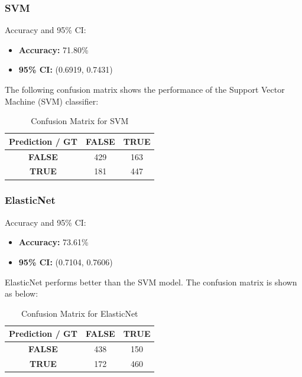 \subsubsection{SVM}

Accuracy and 95\% CI:

\begin{itemize}
    \item \textbf{Accuracy:} 71.80\%
    \item \textbf{95\% CI:} (0.6919, 0.7431)
\end{itemize}

The following confusion matrix shows the performance of the Support Vector Machine (SVM) classifier:

\begin{table}[ht]
    \centering
    \begin{tabular}{|c|c|c|}
    \hline
    \textbf{Prediction / GT} & \textbf{FALSE} & \textbf{TRUE} \\
    \hline
    \textbf{FALSE} & \cellcolor{red!50} 429 & \cellcolor{cyan!50} 163 \\
    \hline
    \textbf{TRUE} & \cellcolor{cyan!60} 181 & \cellcolor{red!55} 447 \\
    \hline
    \end{tabular}
    \caption{Confusion Matrix for SVM}
    \label{tab:svm_cm}
\end{table}


\subsubsection{ElasticNet}

Accuracy and 95\% CI:

\begin{itemize}
    \item \textbf{Accuracy:} 73.61\%
    \item \textbf{95\% CI:} (0.7104, 0.7606)
\end{itemize}

ElasticNet performs better than the SVM model. The confusion matrix is shown as below:

\begin{table}[ht]
    \centering
    \begin{tabular}{|c|c|c|}
    \hline
    \textbf{Prediction / GT} & \textbf{FALSE} & \textbf{TRUE} \\
    \hline
    \textbf{FALSE} & \cellcolor{red!53} 438 & \cellcolor{cyan!45} 150 \\
    \hline
    \textbf{TRUE} & \cellcolor{cyan!55} 172 & \cellcolor{red!60} 460 \\
    \hline
    \end{tabular}
    \caption{Confusion Matrix for ElasticNet}
    \label{tab:elasticnet_cm}
\end{table}

